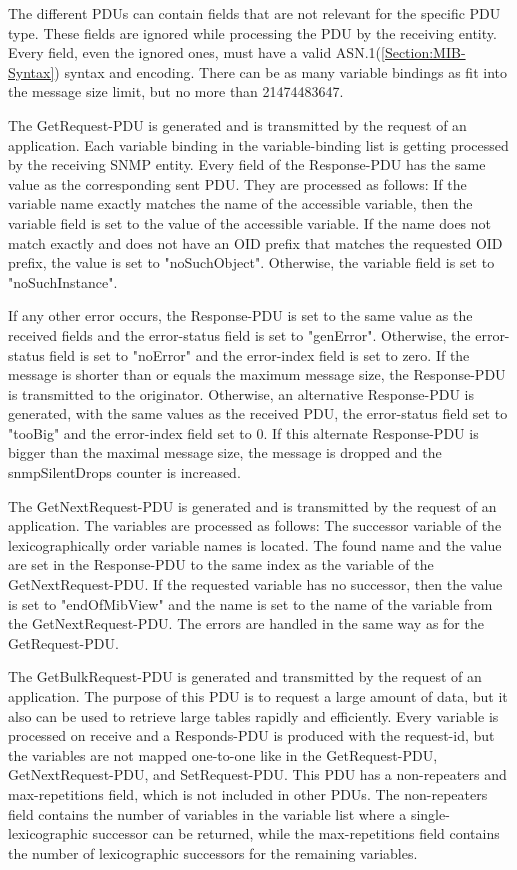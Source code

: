 The different PDUs can contain fields that are not relevant for the specific PDU type. These fields are ignored while processing the PDU by the receiving entity. Every field, even the ignored ones, must have a valid ASN.1(\ref{Section:MIB-Syntax}) syntax and encoding. There can be as many variable bindings as fit into the message size limit, but no more than 21474483647.

\newpage
The GetRequest-PDU is generated and is transmitted by the request of an application. Each variable binding in the variable-binding list is getting processed by the receiving SNMP entity. Every field of the Response-PDU has the same value as the corresponding sent PDU. They are processed as follows: If the variable name exactly matches the name of the accessible variable, then the variable field is set to the value of the accessible variable.  If the name does not match exactly and does not have an OID prefix that matches the requested OID prefix, the value is set to "noSuchObject". Otherwise, the variable field is set to "noSuchInstance".

If any other error occurs, the Response-PDU is set to the same value as the received fields and the error-status field is set to "genError". Otherwise, the error-status field is set to "noError" and the error-index field is set to zero. If the message is shorter than or equals the maximum message size, the Response-PDU is transmitted to the originator. Otherwise, an alternative Response-PDU is generated, with the same values as the received PDU, the error-status field set to "tooBig" and the error-index field set to 0. If this alternate Response-PDU is bigger than the maximal message size, the message is dropped and the snmpSilentDrops counter is increased.

The GetNextRequest-PDU is generated and is transmitted by the request of an application. The variables are processed as follows: The successor variable of the lexicographically order variable names is located. The found name and the value are set in the Response-PDU to the same index as the variable of the GetNextRequest-PDU. If the requested variable has no successor, then the value is set to "endOfMibView" and the name is set to the name of the variable from the GetNextRequest-PDU. The errors are handled in the same way as for the GetRequest-PDU.

The GetBulkRequest-PDU is generated and transmitted by the request of an application. The purpose of this PDU is to request a large amount of data, but it also can be used to retrieve large tables rapidly and efficiently. Every variable is processed on receive and a Responds-PDU is produced with the request-id, but the variables are not mapped one-to-one like in the GetRequest-PDU, GetNextRequest-PDU, and SetRequest-PDU. This PDU has a non-repeaters and max-repetitions field, which is not included in other PDUs. The non-repeaters field contains the number of variables in the variable list where a single-lexicographic successor can be returned, while the max-repetitions field contains the number of lexicographic successors for the remaining variables.

